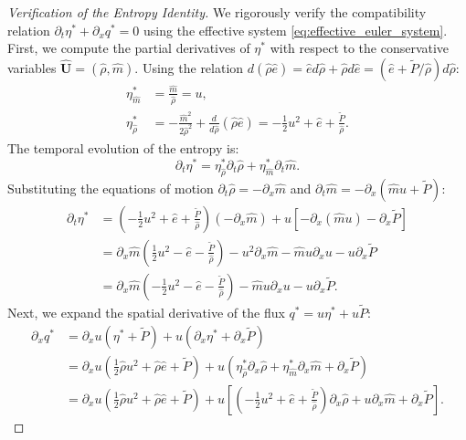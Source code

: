 \documentclass[12pt, reqno]{article}
\theoremstyle{definition}
\newcommand{\pa}{\partial}
\numberwithin{equation}{section}
\begin{document}
\begin{proof}[Verification of the Entropy Identity]
We rigorously verify the compatibility relation $\pa_t \eta^* + \pa_x q^* = 0$ using the effective system \eqref{eq:effective_euler_system}. 
First, we compute the partial derivatives of $\eta^*$ with respect to the conservative variables $\hat{\mathbf{U}} = (\hat{\rho}, \hat{m})$.
Using the relation $d(\hat{\rho}\hat{e}) = \hat{e}d\hat{\rho} + \hat{\rho}d\hat{e} = (\hat{e} + \tilde{P}/\hat{\rho})d\hat{\rho}$:
\begin{align*}
    \eta^*_{\hat{m}} &= \frac{\hat{m}}{\hat{\rho}} = u, \\
    \eta^*_{\hat{\rho}} &= -\frac{\hat{m}^2}{2\hat{\rho}^2} + \frac{d}{d\hat{\rho}}(\hat{\rho}\hat{e}) = -\frac{1}{2}u^2 + \hat{e} + \frac{\tilde{P}}{\hat{\rho}}.
\end{align*}
The temporal evolution of the entropy is:
\[
\pa_t \eta^* = \eta^*_{\hat{\rho}} \pa_t \hat{\rho} + \eta^*_{\hat{m}} \pa_t \hat{m}.
\]
Substituting the equations of motion $\pa_t \hat{\rho} = -\pa_x \hat{m}$ and $\pa_t \hat{m} = -\pa_x (\hat{m}u + \tilde{P})$:
\begin{align} \label{eq:entropy_time_deriv}
    \pa_t \eta^* &= \left( -\frac{1}{2}u^2 + \hat{e} + \frac{\tilde{P}}{\hat{\rho}} \right) (-\pa_x \hat{m}) + u \left[ -\pa_x(\hat{m}u) - \pa_x \tilde{P} \right] \nonumber \\
    &= \pa_x \hat{m} \left( \frac{1}{2}u^2 - \hat{e} - \frac{\tilde{P}}{\hat{\rho}} \right) - u^2 \pa_x \hat{m} - \hat{m}u \pa_x u - u \pa_x \tilde{P} \nonumber \\
    &= \pa_x \hat{m} \left( -\frac{1}{2}u^2 - \hat{e} - \frac{\tilde{P}}{\hat{\rho}} \right) - \hat{m}u \pa_x u - u \pa_x \tilde{P}.
\end{align}
Next, we expand the spatial derivative of the flux $q^* = u \eta^* + u \tilde{P}$:
\begin{align} \label{eq:entropy_flux_deriv}
    \pa_x q^* &= \pa_x u (\eta^* + \tilde{P}) + u (\pa_x \eta^* + \pa_x \tilde{P}) \nonumber \\
    &= \pa_x u \left( \frac{1}{2}\hat{\rho}u^2 + \hat{\rho}\hat{e} + \tilde{P} \right) + u \left( \eta^*_{\hat{\rho}} \pa_x \hat{\rho} + \eta^*_{\hat{m}} \pa_x \hat{m} + \pa_x \tilde{P} \right) \nonumber \\
    &= \pa_x u \left( \frac{1}{2}\hat{\rho}u^2 + \hat{\rho}\hat{e} + \tilde{P} \right) + u \left[ \left(-\frac{1}{2}u^2 + \hat{e} + \frac{\tilde{P}}{\hat{\rho}}\right)\pa_x \hat{\rho} + u \pa_x \hat{m} + \pa_x \tilde{P} \right].

\end{align}
\end{proof}
\end{document}
